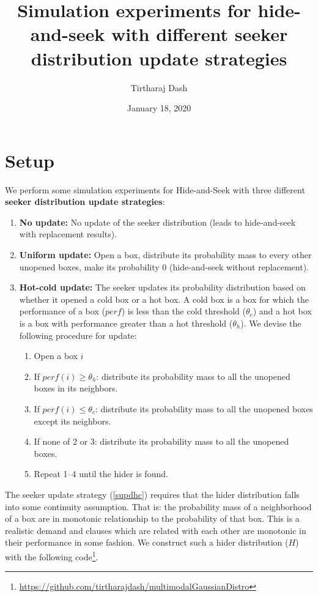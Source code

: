 \documentclass[11pt,a4paper,draft]{article}
\title{Simulation experiments for hide-and-seek with different seeker distribution update strategies}
\author{Tirtharaj Dash}
\date{January 18, 2020}
\begin{document}
\maketitle

\section{Setup}

\noindent
We perform some simulation experiments for Hide-and-Seek with three different \textbf{seeker distribution update strategies}:
\begin{enumerate}[(1)]
	\item\label{snoupd} \textbf{No update:} No update of the seeker distribution (leads to hide-and-seek with replacement results).
	\item\label{supdwor} \textbf{Uniform update:} Open a box, distribute its probability mass to every other unopened boxes, make its probability 0 (hide-and-seek without replacement).
	\item\label{supdhc} \textbf{Hot-cold update:} The seeker updates its probability distribution based on whether it opened a cold box or a hot box. A cold box is a box for which the performance of a box ($perf$) is less than the cold threshold ($\theta_c$) and a hot box is a box with performance greater than a hot threshold ($\theta_h$). We devise the following procedure for update:
	\begin{enumerate}[1.]
		\item Open a box $i$
		\item If $perf(i) \geq \theta_h$: distribute its probability mass to all the unopened boxes in its neighbors. 
		\item If $perf(i) \leq \theta_c$: distribute its probability mass to all the unopened boxes except its neighbors.
		\item If none of 2 or 3: distribute its probability mass to all the unopened boxes.
		\item Repeat 1--4 until the hider is found.
	\end{enumerate}
\end{enumerate}

\noindent
The seeker update strategy (\ref{supdhc}) requires that the hider distribution falls into some continuity assumption. That is: the probability mass of a neighborhood of a box are in monotonic relationship to the probability of that box. This is a realistic demand and clauses which are related with each other are monotonic in their performance in some fashion. We construct such a hider distribution ($H$) with the following code\footnote{\url{https://github.com/tirtharajdash/multimodalGaussianDistro}}.
\end{document}
